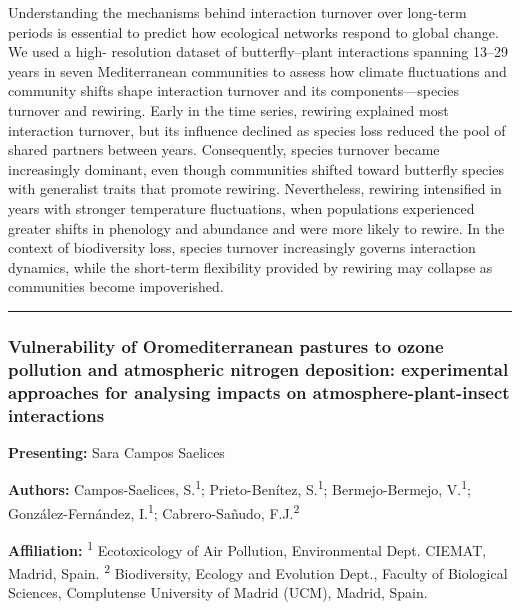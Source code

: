 \documentclass[
  letterpaper,
  DIV=11,
  numbers=noendperiod]{scrartcl}
\begin{document}
Understanding the mechanisms behind interaction turnover over long-term
periods is essential to predict how ecological networks respond to
global change. We used a high- resolution dataset of butterfly--plant
interactions spanning 13--29 years in seven Mediterranean communities to
assess how climate fluctuations and community shifts shape interaction
turnover and its components---species turnover and rewiring. Early in
the time series, rewiring explained most interaction turnover, but its
influence declined as species loss reduced the pool of shared partners
between years. Consequently, species turnover became increasingly
dominant, even though communities shifted toward butterfly species with
generalist traits that promote rewiring. Nevertheless, rewiring
intensified in years with stronger temperature fluctuations, when
populations experienced greater shifts in phenology and abundance and
were more likely to rewire. In the context of biodiversity loss, species
turnover increasingly governs interaction dynamics, while the short-term
flexibility provided by rewiring may collapse as communities become
impoverished.

\begin{center}\rule{0.5\linewidth}{0.5pt}\end{center}

\subsubsection{Vulnerability of Oromediterranean pastures to ozone
pollution and atmospheric nitrogen deposition: experimental approaches
for analysing impacts on atmosphere-plant-insect
interactions}\label{vulnerability-of-oromediterranean-pastures-to-ozone-pollution-and-atmospheric-nitrogen-deposition-experimental-approaches-for-analysing-impacts-on-atmosphere-plant-insect-interactions}

\textbf{Presenting:} Sara Campos Saelices

\textbf{Authors:} Campos-Saelices, S.\textsuperscript{1};
Prieto-Benítez, S.\textsuperscript{1}; Bermejo-Bermejo,
V.\textsuperscript{1}; González-Fernández, I.\textsuperscript{1};
Cabrero-Sañudo, F.J.\textsuperscript{2}

\textbf{Affiliation:} \textsuperscript{1} Ecotoxicology of Air
Pollution, Environmental Dept. CIEMAT, Madrid, Spain.
\textsuperscript{2} Biodiversity, Ecology and Evolution Dept., Faculty
of Biological Sciences, Complutense University of Madrid (UCM), Madrid,
Spain.
\end{document}
